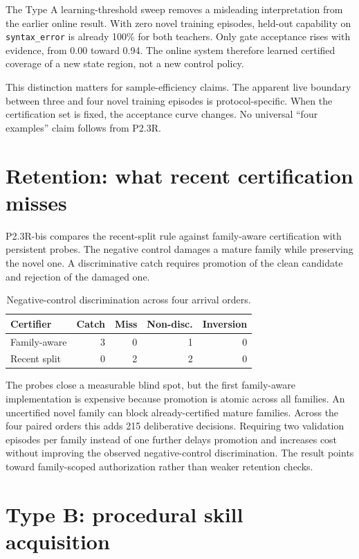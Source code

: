 \documentclass[10pt]{article}
\begin{document}
The Type A learning-threshold sweep removes a misleading interpretation from the earlier online result. With zero novel training episodes, held-out capability on \texttt{syntax\_error} is already 100\% for both teachers. Only gate acceptance rises with evidence, from 0.00 toward 0.94. The online system therefore learned certified coverage of a new state region, not a new control policy.

This distinction matters for sample-efficiency claims. The apparent live boundary between three and four novel training episodes is protocol-specific. When the certification set is fixed, the acceptance curve changes. No universal ``four examples'' claim follows from P2.3R.

\section{Retention: what recent certification misses}

P2.3R-bis compares the recent-split rule against family-aware certification with persistent probes. The negative control damages a mature family while preserving the novel one. A discriminative catch requires promotion of the clean candidate and rejection of the damaged one.

\begin{table}[t]
\centering
\caption{Negative-control discrimination across four arrival orders.}
\label{tab:retention}
\begin{tabular}{lrrrr}
\toprule
Certifier & Catch & Miss & Non-disc. & Inversion \\
\midrule
Family-aware & 3 & 0 & 1 & 0 \\
Recent split & 0 & 2 & 2 & 0 \\
\bottomrule
\end{tabular}
\end{table}

The probes close a measurable blind spot, but the first family-aware implementation is expensive because promotion is atomic across all families. An uncertified novel family can block already-certified mature families. Across the four paired orders this adds 215 deliberative decisions. Requiring two validation episodes per family instead of one further delays promotion and increases cost without improving the observed negative-control discrimination. The result points toward family-scoped authorization rather than weaker retention checks.

\section{Type B: procedural skill acquisition}
\end{document}
